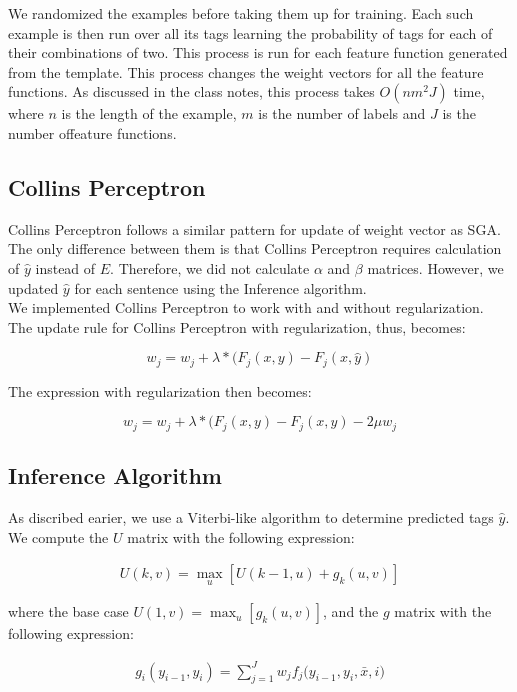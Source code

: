 \documentclass[11pt,a4paper,oneside]{article}
\begin{document}
We randomized the examples before taking them up for training. Each such example is then run over all its tags learning the probability of tags for each of their combinations of two. This process is run for each feature function generated from the template. This process changes the weight vectors for all the feature functions. As discussed in the class notes, this process takes $O(nm^2J)$ time, where $n$ is the length of the example, $m$ is the number of labels and $J$ is the number offeature functions.

\subsection{Collins Perceptron}

Collins Perceptron follows a similar pattern for update of weight vector as SGA. The only difference between them is that Collins Perceptron requires calculation of $\hat{y}$ instead of $E$. Therefore, we did not calculate $\alpha$ and $\beta$ matrices. However, we updated $\hat{y}$ for each sentence using the Inference algorithm. \\

We implemented Collins Perceptron to work with and without regularization. The update rule for Collins Perceptron with regularization, thus, becomes:

\begin{equation}
w_j = w_j + \lambda * (F_j(x, y) - F_j(x,\hat{y})
\end{equation}

The expression with regularization then becomes:

\begin{equation}
w_j = w_j + \lambda * (F_j(x, y) - F_j(x,\hat{y}) - 2\mu w_j
\end{equation}
\subsection{Inference Algorithm}
As discribed earier, we use a Viterbi-like algorithm to determine predicted tags $\hat{y}$. We compute the $U$ matrix with the following expression:

\begin{align}
U(k,v) = \max_{u}[U(k - 1, u) + g_k(u, v)]
\end{align}

where the base case $U(1,v) = \max_{u}[g_k(u, v)]$, and the $g$ matrix with the following expression:

\begin{align}
g_i(y_{i-1}, y_{i}) = \sum^{J}_{j = 1}{w_jf_j(y_{i-1}, y_{i}, \bar{x}, i})
\end{align}
\end{document}
